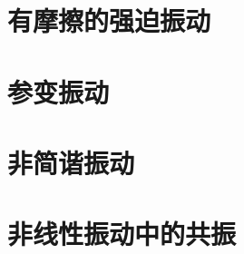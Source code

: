 \documentclass[11pt,a4paper]{article}
\begin{document}
\section{有摩擦的强迫振动}
\cite{2007理论物理学教程} 



















\section{参变振动}
\cite{2007理论物理学教程} 















\section{非简谐振动}
\cite{2007理论物理学教程} 









\section{非线性振动中的共振}
\cite{2007理论物理学教程} 
\end{document}
